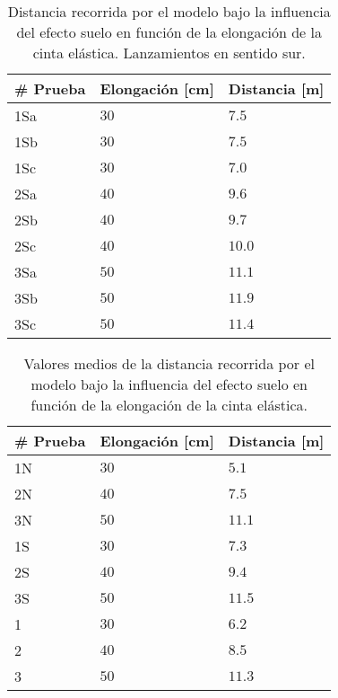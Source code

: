 \begin{table}[ht]
\centering
\caption{Distancia recorrida por el modelo bajo la influencia del efecto suelo en función de la elongación de la cinta elástica. Lanzamientos en sentido sur.}
\label{tab:test1geS}
\begin{tabular}{lll}
\toprule
\# Prueba      & Elongación [cm] & Distancia [m]    \\ \midrule
1Sa              & $30$           & $7.5$             \\
1Sb              & $30$           & $7.5$             \\
1Sc              & $30$           & $7.0$             \\ \hline
2Sa              & $40$           & $9.6$                \\
2Sb              & $40$           & $9.7$                \\
2Sc              & $40$           & $10.0$                \\ \hline
3Sa              & $50$           & $11.1$                \\
3Sb              & $50$           & $11.9$                \\
3Sc              & $50$           & $11.4$                \\ \bottomrule
\end{tabular}
\end{table}

\begin{table}[ht]
\centering
\caption{Valores medios de la distancia recorrida por el modelo bajo la influencia del efecto suelo en función de la elongación de la cinta elástica.}
\label{tab:test1ge}
\begin{tabular}{lll}
\toprule
\# Prueba      & Elongación [cm] & Distancia [m]    \\ \midrule
1N              & $30$           & $5.1$             \\
2N              & $40$           & $7.5$             \\
3N              & $50$           & $11.1$             \\ \hline
1S              & $30$           & $7.3$                \\
2S              & $40$           & $9.4$                \\
3S              & $50$           & $11.5$                \\ \hline
1              & $30$           & $6.2$                \\
2              & $40$           & $8.5$                \\
3              & $50$           & $11.3$                \\ \bottomrule
\end{tabular}
\end{table}

